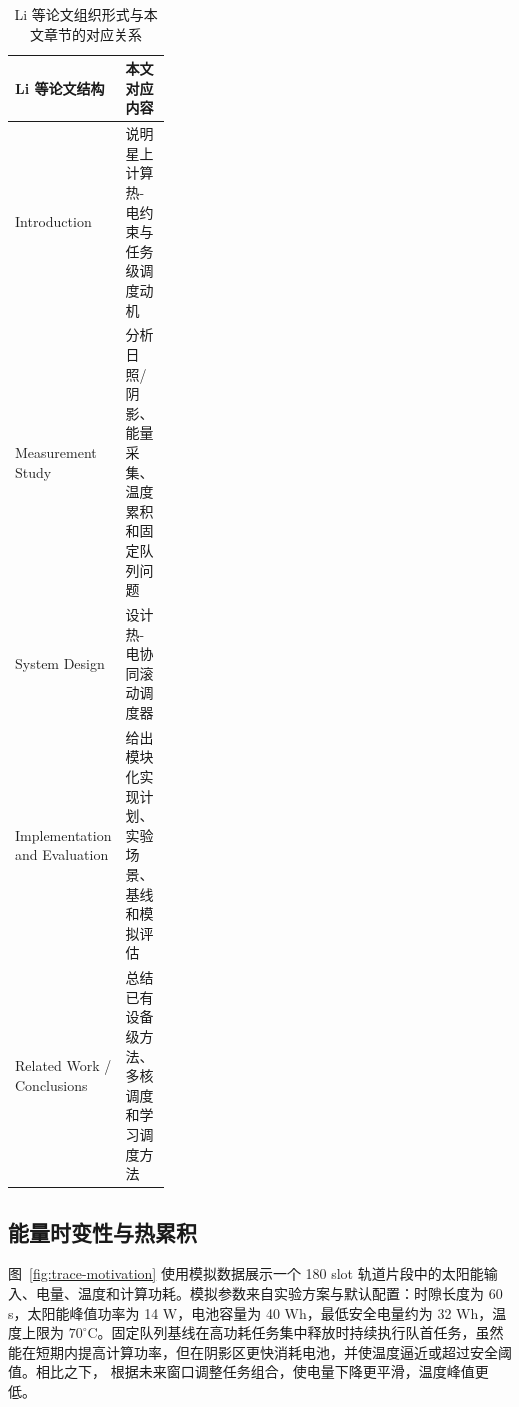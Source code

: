 \begin{table}[t]
\centering
\caption{Li 等论文组织形式与本文章节的对应关系}
\label{tab:org-map}
\begin{tabularx}{\linewidth}{p{0.31\linewidth}X}
\toprule
Li 等论文结构 & 本文对应内容 \\
\midrule
Introduction & 说明星上计算热-电约束与任务级调度动机 \\
Measurement Study & 分析日照/阴影、能量采集、温度累积和固定队列问题 \\
System Design & 设计热-电协同滚动调度器 \method{} \\
Implementation and Evaluation & 给出模块化实现计划、实验场景、基线和模拟评估 \\
Related Work / Conclusions & 总结已有设备级方法、多核调度和学习调度方法 \\
\bottomrule
\end{tabularx}
\end{table}

\subsection{能量时变性与热累积}

图~\ref{fig:trace-motivation} 使用模拟数据展示一个 180 slot 轨道片段中的太阳能输入、电量、温度和计算功耗。模拟参数来自实验方案与默认配置：时隙长度为 60 s，太阳能峰值功率为 14 W，电池容量为 40 Wh，最低安全电量约为 32 Wh，温度上限为 $70^\circ$C。固定队列基线在高功耗任务集中释放时持续执行队首任务，虽然能在短期内提高计算功率，但在阴影区更快消耗电池，并使温度逼近或超过安全阈值。相比之下，\method{} 根据未来窗口调整任务组合，使电量下降更平滑，温度峰值更低。

